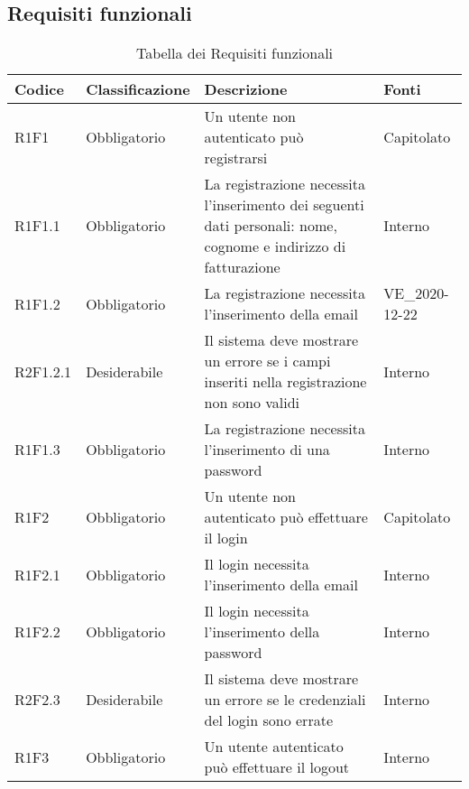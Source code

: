 \subsection{Requisiti funzionali} 


{


\centering
\renewcommand{\arraystretch}{2}
\begin{longtable}{C{2.5cm} C{2.8cm} C{6.7cm} C{2.5cm}}
\caption{Tabella dei Requisiti funzionali}\\
\textbf{Codice} &
\textbf{Classificazione}&
\textbf{Descrizione}&
\textbf{Fonti}\\
\endhead


R1F1 & Obbligatorio & Un utente non autenticato può registrarsi & Capitolato \\
R1F1.1 & Obbligatorio & La registrazione necessita l'inserimento dei seguenti dati personali: nome, cognome e indirizzo di fatturazione & Interno \\
R1F1.2 & Obbligatorio & La registrazione necessita l'inserimento della email & VE\_2020-12-22 \\
R2F1.2.1 & Desiderabile & Il sistema deve mostrare un errore se i campi inseriti nella registrazione non sono validi & Interno \\
R1F1.3 & Obbligatorio & La registrazione necessita l'inserimento di una password & Interno \\


R1F2 & Obbligatorio & Un utente non autenticato può effettuare il login & Capitolato \\
R1F2.1 & Obbligatorio & Il login necessita l'inserimento della email & Interno \\
R1F2.2 & Obbligatorio & Il login necessita l'inserimento della password & Interno \\
R2F2.3 & Desiderabile & Il sistema deve mostrare un errore se le credenziali del login sono errate & Interno \\


R1F3 & Obbligatorio & Un utente autenticato può effettuare il logout & Interno \\



\end{longtable}}
